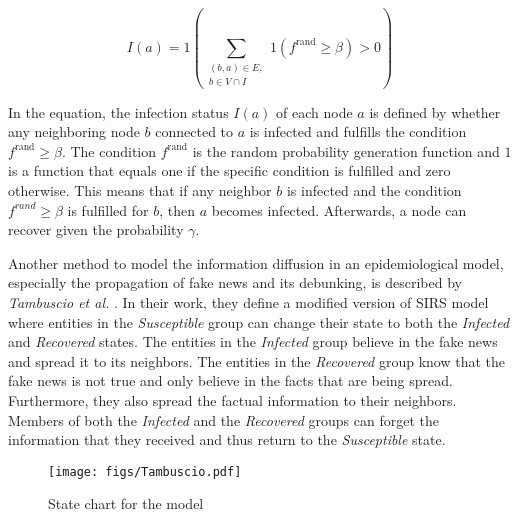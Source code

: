 \begin{equation}
    I(a) = 1 (\sum\limits_{\substack{(b,a)\in E, \\ b \in V \cap I}}
    1(f^{\mathrm{rand}}\geq \beta)>0) 
    \label{eqbasicpropagation}
\end{equation}

In the equation, the infection status $I(a)$ of each node $a$ is defined 
by whether any neighboring node $b$ connected to $a$ is infected 
and fulfills the condition $f^{\mathrm{rand}}\geq \beta$.
The condition $f^{\mathrm{rand}}$ is the random probability generation function and $1$ 
is a function that equals one if the specific condition is fulfilled and 
zero otherwise. This means that if any neighbor $b$ is infected and the 
condition $f^{rand}\geq \beta$ is fulfilled for $b$, then $a$ becomes infected. 
Afterwards, a node can recover given the probability $\gamma$.

Another method to model the information diffusion in an epidemiological model, 
especially the propagation of fake news and its debunking,
is described by \textit{Tambuscio et al.} \cite{sirsmodel}. In their work, they
define a modified version of SIRS model where entities in the \textit{Susceptible}
group can change their state to both the \textit{Infected} and
\textit{Recovered} states.
The entities in the \textit{Infected} group believe in the fake news and spread it 
to its neighbors.
The entities in the \textit{Recovered} group know that the fake news is not 
true and only believe in the facts that are being spread. Furthermore, they
also spread the factual information to their neighbors.
Members of both the \textit{Infected} and the \textit{Recovered} groups 
can forget the information that they received 
and thus return to the \textit{Susceptible} state.

\begin{figure}[!ht]
    \center
    \texttt{[image: figs/Tambuscio.pdf]}
    \caption{State chart for the model \cite{sirsmodel}}
    \label{originalmodelstatechart}
\end{figure}

